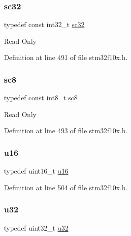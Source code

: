 \subsubsection{\texorpdfstring{sc32}{sc32}}
{\footnotesize\ttfamily typedef const int32\+\_\+t \hyperlink{group___exported__types_gad97679599f3791409523fdb1c6156a28}{sc32}}

Read Only 

Definition at line 491 of file stm32f10x.\+h.

\mbox{\label{group___exported__types_ga30e6c0f6718e1b6d26dc9d94ddcf9d11}} 
\subsubsection{\texorpdfstring{sc8}{sc8}}
{\footnotesize\ttfamily typedef const int8\+\_\+t \hyperlink{group___exported__types_ga30e6c0f6718e1b6d26dc9d94ddcf9d11}{sc8}}

Read Only 

Definition at line 493 of file stm32f10x.\+h.

\mbox{\label{group___exported__types_gace9d960e74685e2cd84b36132dbbf8aa}} 
\subsubsection{\texorpdfstring{u16}{u16}}
{\footnotesize\ttfamily typedef uint16\+\_\+t \hyperlink{group___exported__types_gace9d960e74685e2cd84b36132dbbf8aa}{u16}}



Definition at line 504 of file stm32f10x.\+h.

\mbox{\label{group___exported__types_gafaa62991928fb9fb18ff0db62a040aba}} 
\subsubsection{\texorpdfstring{u32}{u32}}
{\footnotesize\ttfamily typedef uint32\+\_\+t \hyperlink{group___exported__types_gafaa62991928fb9fb18ff0db62a040aba}{u32}}



